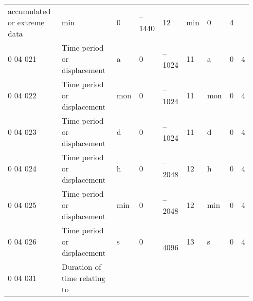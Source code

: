 \begin{longtable}[]{@{}lllllllll@{}}
\begin{minipage}[t]{0.08\columnwidth}
accumulated or extreme data\strut
\end{minipage} & \begin{minipage}[t]{0.08\columnwidth}\raggedright
min\strut
\end{minipage} & \begin{minipage}[t]{0.08\columnwidth}\raggedright
0\strut
\end{minipage} & \begin{minipage}[t]{0.08\columnwidth}\raggedright
--1440\strut
\end{minipage} & \begin{minipage}[t]{0.08\columnwidth}\raggedright
12\strut
\end{minipage} & \begin{minipage}[t]{0.08\columnwidth}\raggedright
min\strut
\end{minipage} & \begin{minipage}[t]{0.08\columnwidth}\raggedright
0\strut
\end{minipage} & \begin{minipage}[t]{0.08\columnwidth}\raggedright
4\strut
\end{minipage}\tabularnewline
0 04 021 & Time period or displacement & a & 0 & --1024 & 11 & a & 0 & 4\tabularnewline
0 04 022 & Time period or displacement & mon & 0 & --1024 & 11 & mon & 0 & 4\tabularnewline
0 04 023 & Time period or displacement & d & 0 & --1024 & 11 & d & 0 & 4\tabularnewline
0 04 024 & Time period or displacement & h & 0 & --2048 & 12 & h & 0 & 4\tabularnewline
0 04 025 & Time period or displacement & min & 0 & --2048 & 12 & min & 0 & 4\tabularnewline
0 04 026 & Time period or displacement & s & 0 & --4096 & 13 & s & 0 & 4\tabularnewline
\begin{minipage}[t]{0.08\columnwidth}\raggedright
0 04 031\strut
\end{minipage} & \begin{minipage}[t]{0.08\columnwidth}\raggedright
Duration of time relating to


\end{minipage}
\end{longtable}

